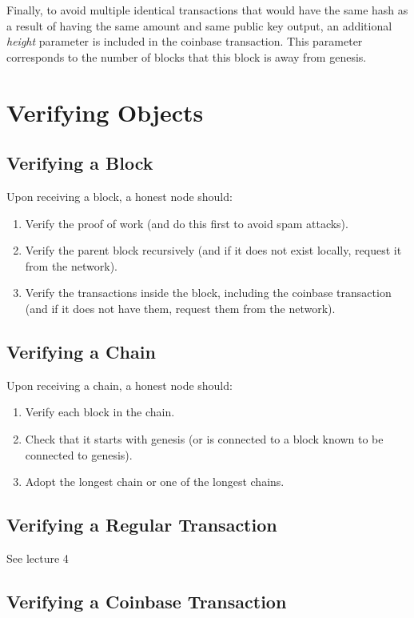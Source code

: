 Finally, to avoid multiple identical transactions that would have the same hash as a result of having the same amount and same public key output, an additional \emph{height} parameter is included in the coinbase transaction. This parameter corresponds to the number of blocks that this block is away from genesis.

\section{Verifying Objects}

\subsection{Verifying a Block}

Upon receiving a block, a honest node should:
\begin{enumerate}
    \item Verify the proof of work (and do this first to avoid spam attacks).
    \item Verify the parent block recursively (and if it does not exist locally, request it from the network).
    \item Verify the transactions inside the block, including the coinbase transaction (and if it does not have them, request them from the network).
\end{enumerate}

\subsection{Verifying a Chain}

Upon receiving a chain, a honest node should:
\begin{enumerate}
    \item Verify each block in the chain.
    \item Check that it starts with genesis (or is connected to a block known to be connected to genesis).
    \item Adopt the longest chain or one of the longest chains.
\end{enumerate}

\subsection{Verifying a Regular Transaction}

See lecture 4

\subsection{Verifying a Coinbase Transaction}

